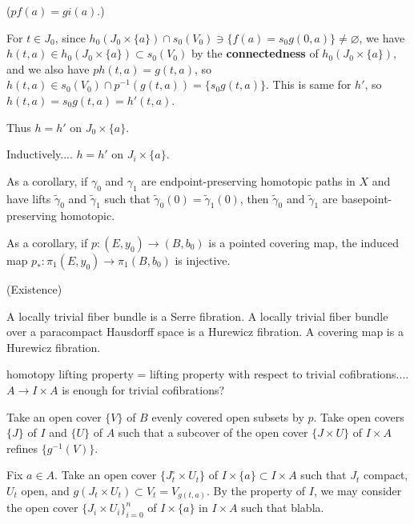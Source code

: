 \documentclass{../../large}
\begin{document}
\begin{pf}
\qquad(\because $pf(a)=gi(a)$.)


For $t\in J_0$, since $h_0(J_0\times\{a\})\cap s_0(V_0)\ni\{f(a)=s_0g(0,a)\}\ne\varnothing$, we have $h(t,a)\in h_0(J_0\times\{a\})\subset s_0(V_0)$ by the \textbf{connectedness} of $h_0(J_0\times\{a\})$, and we also have $ph(t,a)=g(t,a)$, so $h(t,a)\in s_0(V_0)\cap p^{-1}(g(t,a))=\{s_0g(t,a)\}$.
This is same for $h'$, so $h(t,a)=s_0g(t,a)=h'(t,a)$.

Thus $h=h'$ on $J_0\times\{a\}$.

Inductively.... $h=h'$ on $J_i\times\{a\}$.



\end{pf}



As a corollary, if $\gamma_0$ and $\gamma_1$ are endpoint-preserving homotopic paths in $X$ and have lifts $\tilde\gamma_0$ and $\tilde\gamma_1$ such that $\tilde\gamma_0(0)=\tilde\gamma_1(0)$, then $\tilde\gamma_0$ and $\tilde\gamma_1$ are basepoint-preserving homotopic.

As a corollary, if $p:(E,y_0)\to(B,b_0)$ is a pointed covering map, the induced map $p_*:\pi_1(E,y_0)\to\pi_1(B,b_0)$ is injective.


(Existence)


A locally trivial fiber bundle is a Serre fibration.
A locally trivial fiber bundle over a paracompact Hausdorff space is a Hurewicz fibration.
A covering map is a Hurewicz fibration.

homotopy lifting property = lifting property with respect to trivial cofibrations....
$A\to I\times A$ is enough for trivial cofibrations?


\bigskip
Take an open cover $\{V\}$ of $B$ evenly covered open subsets by $p$.
Take open covers $\{J\}$ of $I$ and $\{U\}$ of $A$ such that a subcover of the open cover $\{J\times U\}$ of $I\times A$ refines $\{g^{-1}(V)\}$.


Fix $a\in A$.
Take an open cover $\{J_t^\circ\times U_t\}$ of $I\times\{a\}\subset I\times A$ such that $J_t$ compact, $U_t$ open, and $g(J_t\times U_t)\subset V_t=V_{g(t,a)}$.
By the property of $I$, we may consider the open cover $\{J_i\times U_i\}_{i=0}^n$ of $I\times\{a\}$ in $I\times A$ such that blabla.
\end{document}
